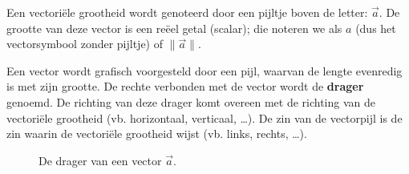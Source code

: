 \documentclass{ximera}
\begin{document}
Een vectoriële grootheid wordt genoteerd door een pijltje boven de letter: $\vec{a}$. De grootte van deze vector is een reëel getal (scalar); die noteren we als $a$ (dus het vectorsymbool zonder pijltje) of $\|\vec{a}\|$.

Een vector wordt grafisch voorgesteld door een pijl, waarvan de lengte evenredig is met zijn grootte. De rechte verbonden met de vector wordt de \textbf{drager} genoemd. De richting van deze drager komt overeen met de richting van de vectoriële grootheid (vb. horizontaal, verticaal, \dots). De zin van de vectorpijl is de zin waarin de vectoriële grootheid wijst (vb. links, rechts, \dots).

\begin{figure}[ht!]
    \captionsetup{width=0.85\textwidth}
    \begin{center}
    \end{center}
    \caption{De drager van een vector $\vec{a}$.}
    \label{fig:drager_vector}
\end{figure}
\end{document}

